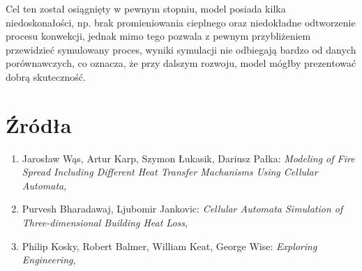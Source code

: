 \documentclass{article}
\begin{document}
Cel ten został osiągnięty w pewnym stopniu, model posiada kilka niedoskonałości, np. brak promieniowania cieplnego
oraz niedokładne odtworzenie procesu konwekcji, jednak mimo tego pozwala z pewnym przybliżeniem przewidzieć symulowany proces, wyniki symulacji
nie odbiegają bardzo od danych porównawczych, co oznacza, że przy dalszym rozwoju, model mógłby prezentować dobrą skuteczność.



\section{Źródła}
\begin{enumerate}
    \item
    Jarosław Wąs, Artur Karp, Szymon Łukasik, Dariusz Pałka: \textit{Modeling of Fire Spread Including Different 
    Heat Transfer Machanisms Using Cellular Automata},
    \item
    Purvesh Bharadawaj, Ljubomir Jankovic: \textit{Cellular Automata Simulation of Three-dimensional Building Heat Loss},
    \item
    Philip Kosky, Robert Balmer, William Keat, George Wise: \textit{Exploring Engineering},
\end{enumerate}
\end{document}
